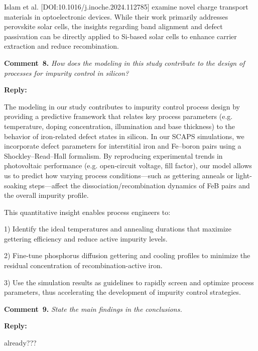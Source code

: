 \documentclass[a4paper,fleqn]{cas-sc}
\begin{document}
Islam et al. [DOI:10.1016/j.inoche.2024.112785] examine novel charge transport materials in optoelectronic devices. While their work primarily addresses perovskite solar cells, the insights regarding band alignment and defect passivation can be directly applied to Si-based solar cells to enhance carrier extraction and reduce recombination.

\noindent
\textcolor[rgb]{0.00,0.50,1.00}{\textbf{Comment~8.}}
\emph{How does the modeling in this study contribute to the design of processes for impurity control in silicon?}

\noindent
\textcolor[rgb]{0.51,0.00,0.00}{\textbf{Reply:}}

The modeling in our study contributes to impurity control process design by providing a predictive framework that relates key process parameters (e.g. temperature, doping concentration, illumination and base thickness) to the behavior of iron‐related defect states in silicon. In our SCAPS simulations, we incorporate defect parameters for interstitial iron and Fe–boron pairs using a Shockley–Read–Hall formalism. By reproducing experimental trends in photovoltaic performance (e.g. open‑circuit voltage, fill factor), our model allows us to predict how varying process conditions—such as gettering anneals or light-soaking steps—affect the dissociation/recombination dynamics of FeB pairs and the overall impurity profile.

This quantitative insight enables process engineers to:

1) Identify the ideal temperatures and annealing durations that maximize gettering efficiency and reduce active impurity levels.


2) Fine-tune phosphorus diffusion gettering and cooling profiles to minimize the residual concentration of recombination-active iron.


3) Use the simulation results as guidelines to rapidly screen and optimize process parameters, thus accelerating the development of impurity control strategies.


\noindent
\textcolor[rgb]{0.00,0.50,1.00}{\textbf{Comment~9.}}
\emph{State the main findings in the conclusions.}

\noindent
\textcolor[rgb]{0.51,0.00,0.00}{\textbf{Reply:}}

already???



\end{document}
